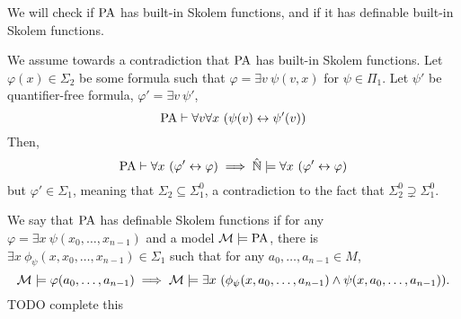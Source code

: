 \subquestion{}
We will check if $\operatorname{PA}$ has built-in Skolem functions, and if it has definable built-in Skolem functions.
\begin{solution}
	We assume towards a contradiction that $\operatorname{PA}$ has built-in Skolem functions.
	Let $\varphi(x) \in \Sigma_2$ be some formula such that $\varphi = \exists v\ \psi(v, x)$ for $\psi \in \Pi_1$.
	Let $\psi'$ be quantifier-free formula, $\varphi' = \exists v\ \psi'$,
	\[
		\operatorname{PA} \vdash \forall v \forall x\ (\psi(v) \leftrightarrow \psi'(v))
	\]
	Then,
	\[
		\operatorname{PA} \vdash \forall x\ (\varphi' \leftrightarrow \varphi)
		\implies
		\hat{\mathbb{N}}
		\models \forall x\ (\varphi' \leftrightarrow \varphi)
	\]
	but $\varphi' \in \Sigma_1$, meaning that $\Sigma_2 \subseteq \Sigma_1^0$, a contradiction to the fact that $\Sigma_2^0 \supsetneq \Sigma_1^0$.

	We say that $\operatorname{PA}$ has definable Skolem functions if for any $\varphi = \exists x\ \psi(x_0, \ldots, x_{n - 1})$ and a model $\mathcal{M} \models \operatorname{PA}$,
	there is $\exists x\ \phi_{\psi}(x, x_0, \ldots, x_{n - 1}) \in \Sigma_1$ such that for any $a_0, \ldots, a_{n - 1} \in M$,
	\[
		\mathcal{M} \models \varphi(a_0, \ldots, a_{n - 1})
		\implies \mathcal{M} \models \exists x\ (\phi_{\psi}(x, a_0, \ldots, a_{n - 1}) \land \psi(x, a_0, \ldots, a_{n - 1}))
	.\]
	TODO complete this
\end{solution}

